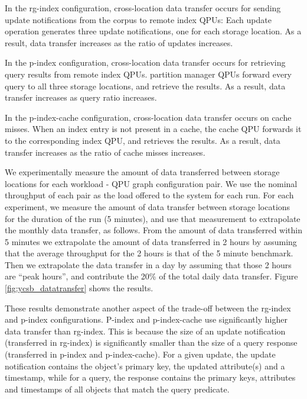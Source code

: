 In the rg-index configuration, cross-location data transfer occurs for sending update notifications from the corpus
to remote index QPUs:
Each update operation generates three update notifications, one for each storage location.
As a result, data transfer increases as the ratio of updates increases.

In the p-index configuration, cross-location data transfer occurs for retrieving query results from remote index QPUs.
partition manager QPUs forward every query to all three storage locations, and retrieve the results.
As a result, data transfer increases as query ratio increases.

In the p-index-cache configuration, cross-location data transfer occurs on cache misses.
When an index entry is not present in a cache, the cache QPU forwards it to the corresponding index QPU, and retrieves the
results.
As a result, data transfer increases as the ratio of cache misses increases.

\bigskip
\noindent
We experimentally measure the amount of data transferred between storage locations for each workload - QPU graph configuration
pair.
We use the nominal throughput of each pair as the load offered to the system for each run.
For each experiment, we measure the amount of data transfer between storage locations for the duration of the run (5 minutes),
and use that measurement to extrapolate the monthly data transfer, as follows.
From the amount of data transferred within 5 minutes we extrapolate the amount of data transferred in 2 hours by assuming
that the average throughput for the 2 hours is that of the 5 minute benchmark.
Then we extrapolate the data transfer in a day by assuming that those 2 hours are ``peak hours'',
and contribute the 20\% of the total daily data transfer.
Figure \ref{fig:ycsb_datatransfer} shows the results.

These results demonstrate another aspect of the trade-off between the rg-index and p-index configurations.
P-index and p-index-cache use significantly higher data transfer than rg-index.
This is because the size of an update notification (transferred in rg-index)
is significantly smaller than the size of a query response (transferred in p-index and p-index-cache).
For a given update, the update notification contains the object's primary key, the updated attribute(s) and a timestamp,
while for a query, the response contains the primary keys, attributes and timestamps of all objects that match the query predicate.


